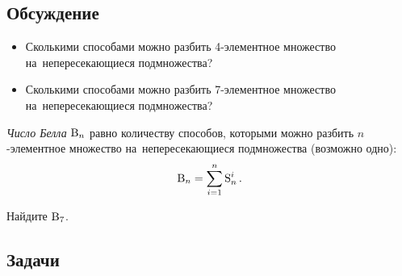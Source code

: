 \subsection*{Обсуждение}

\begin{itemize}

\item
Сколькими способами можно разбить 4-элементное множество на~непересекающиеся
подмножества?

\item
Сколькими способами можно разбить 7-элементное множество на~непересекающиеся
подмножества?

\end{itemize}

\emph{Число Белла} $\mathrm{B}_{n}$ равно количеству способов, которыми можно
разбить $n$-элементное множество на~непересекающиеся подмножества
(возможно одно):
\[
    \mathrm{B}_{n}
=
    \sum_{i=1}^{n}
        \mathrm{S}_{n}^{i}
\, . \]

\begin{exercises}

Найдите $\mathrm{B}_{7}$.

\end{exercises}


\subsection*{Задачи}

